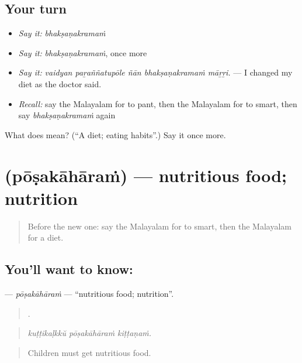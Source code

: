 \subsection*{Your turn}
\begin{itemize}
\raggedright
  \item \emph{Say it:} \emph{bhakṣaṇakramaṁ}
  \item \emph{Say it:} \emph{bhakṣaṇakramaṁ}, once more
  \item \emph{Say it:} \emph{vaidyan paṟaññatupōle ñān bhakṣaṇakramaṁ māṟṟi.} — I changed my diet as the doctor said.
  \item \emph{Recall:} say the Malayalam for to pant, then the Malayalam for to smart, then say \emph{bhakṣaṇakramaṁ} again
\end{itemize}

\begin{tcolorbox}[breakable,colback=teal!4,colframe=teal!35!black,title={Before you move on}]
What does  mean? (\textquotedblleft{}A diet; eating habits\textquotedblright{}.) Say it once more.
\end{tcolorbox}
\section[\texorpdfstring{\ml{പോഷകാഹാരം} (pōṣakāhāraṁ)}{പോഷകാഹാരം (pōṣakāhāraṁ)}]{ (pōṣakāhāraṁ) — nutritious food; nutrition}

\label{lesson:ML-C539-posakaharam}



\begin{quote}
Before the new one: say the Malayalam for to smart, then the Malayalam for a diet.
\end{quote}

\subsection*{You'll want to know: }
\textbf{} — \emph{pōṣakāhāraṁ} — \textquotedblleft{}nutritious food; nutrition\textquotedblright{}.

\begin{quote}
  .
\end{quote}

\begin{quote}
\emph{kuṭṭikaḷkkŭ pōṣakāhāraṁ kiṭṭaṇaṁ.}
\end{quote}

\begin{quote}
Children must get nutritious food.
\end{quote}

